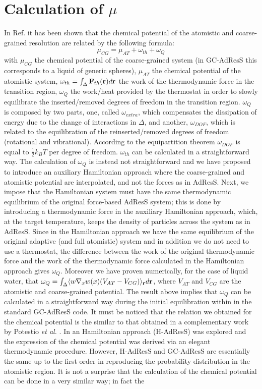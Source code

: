 \documentclass[a4paper,preprint,unsortedaddress]{revtex4-1}
\begin{document}
\section{Calculation of $\mu$}
In Ref.\cite{prx} it has been shown that the chemical potential of the atomistic and coarse-grained resolution are related by the following formula: 
\begin{equation}
\mu_{CG}=\mu_{AT}+\omega_{th}+\omega_{Q}
\label{mu}
\end{equation}
 with $\mu_{CG}$ the chemical potential of the coarse-grained system (in GC-AdResS this corresponds to a liquid of generic spheres), $\mu_{AT}$  the chemical potential of the atomistic system, $\omega_{th}=\int_{\Delta}{\bf F}_{th}({\bf r})d{\bf r}$ the work of the thermodynamic force in the transition region, $\omega_{Q}$ the work/heat provided by the thermostat in order to slowly equilibrate the inserted/removed degrees of freedom in the transition region. $\omega_{Q}$ is composed by two parts, one, called $\omega_{extra}$, which compensates the dissipation of energy due to the change of interactions in $\Delta$, and another, $\omega_{DOF}$, which is related to the equilibration of the reinserted/removed degrees of freedom (rotational and vibrational). According to the equipartition theorem $\omega_{DOF}$ is equal to $\frac{1}{2}k_{B}T$ per degree of freedom. $\omega_{th}$ can be calculated in a straightforward way. The calculation of $\omega_{Q}$ is instead not straightforward and we have proposed to introduce an auxiliary Hamiltonian approach where the coarse-grained and atomistic potential are interpolated, and not the forces as in AdResS. Next, we impose that the Hamiltonian system must have the same thermodynamic equilibrium of the original force-based AdResS system; this is done by introducing a thermodynamic force in the auxiliary Hamiltonian approach, which, at the target temperature, keeps the density of particles across the system as in AdResS. Since in the Hamiltonian approach we have the same equilibrium of the original adaptive (and full atomistic) system  and in addition we do not need to use a thermostat, the difference between the work of the original thermodynamic force and the work of the thermodynamic force calculated in the Hamiltonian approach gives $\omega_{Q}$. Moreover we have proven numerically, for the case of liquid water, that $\omega_{Q}=\int_{\Delta}\langle w\nabla_{x} w(x)( V_{AT}-V_{CG})\rangle_{\bf r} d{\bf r}$, where $V_{AT}$ and $V_{CG}$ are the atomistic and coarse-grained potential. The result above implies that $\omega_{Q}$ can be calculated in a straightforward way during the initial equilibration within in the standard GC-AdResS code. It must be noticed that the relation we obtained for the chemical potential is the similar to that  obtained in a complementary work by Potestio {\it et al.} \cite{h-adress}. In \cite{h-adress} an Hamiltonian approach  (H-AdResS) was explored and the expression of the chemical potential was derived via an elegant thermodynamic procedure. However, H-AdResS and GC-AdResS are essentially the same up to the first order in reproducing the probability distribution in the atomistic region. It is not a surprise that the calculation of the chemical potential can be done in a very similar way; in fact the 
\end{document}
